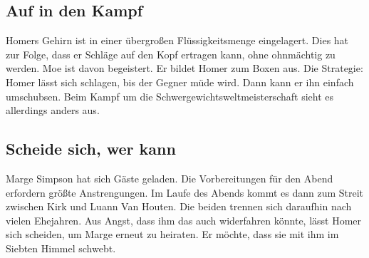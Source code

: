 \subsection{Auf in den Kampf}\label{4F03}
Homers Gehirn ist in einer übergroßen Flüssigkeitsmenge eingelagert. Dies hat zur Folge, dass er Schläge auf den Kopf ertragen kann, ohne ohnmächtig zu werden. Moe ist davon begeistert. Er bildet Homer zum Boxen aus. Die Strategie: Homer lässt sich schlagen, bis der Gegner müde wird. Dann kann er ihn einfach umschubsen. Beim Kampf um die Schwergewichtsweltmeisterschaft sieht es allerdings anders aus.


	
\subsection{Scheide sich, wer kann}\label{4F04}
Marge Simpson hat sich Gäste geladen. Die Vorbereitungen für den Abend erfordern größte Anstrengungen. Im Laufe des Abends kommt es dann zum Streit zwischen Kirk und Luann Van Houten. Die beiden trennen sich daraufhin nach vielen Ehejahren. Aus Angst, dass ihm das auch widerfahren könnte, lässt Homer sich scheiden, um Marge erneut zu heiraten. Er möchte, dass sie mit ihm im Siebten Himmel schwebt.

